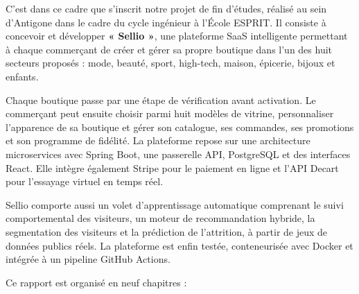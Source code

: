 \documentclass[a4paper,12pt]{report}
\begin{document}
\vspace{0.5cm}

C'est dans ce cadre que s'inscrit notre projet de fin d'études, réalisé au sein d'Antigone dans le cadre du cycle ingénieur à l'École ESPRIT. Il consiste à concevoir et développer \textsf{\textbf{« Sellio »}}, une plateforme SaaS intelligente permettant à chaque commerçant de créer et gérer sa propre boutique dans l'un des huit secteurs proposés : mode, beauté, sport, high-tech, maison, épicerie, bijoux et enfants.

\vspace{0.5cm}

Chaque boutique passe par une étape de vérification avant activation. Le commerçant peut ensuite choisir parmi huit modèles de vitrine, personnaliser l'apparence de sa boutique et gérer son catalogue, ses commandes, ses promotions et son programme de fidélité. La plateforme repose sur une architecture microservices avec Spring Boot, une passerelle API, PostgreSQL et des interfaces React. Elle intègre également Stripe pour le paiement en ligne et l'API Decart pour l'essayage virtuel en temps réel.

\vspace{0.5cm}

Sellio comporte aussi un volet d'apprentissage automatique comprenant le suivi comportemental des visiteurs, un moteur de recommandation hybride, la segmentation des visiteurs et la prédiction de l'attrition, à partir de jeux de données publics réels. La plateforme est enfin testée, conteneurisée avec Docker et intégrée à un pipeline GitHub Actions.

\vspace{0.5cm}

Ce rapport est organisé en neuf chapitres :
\end{document}
